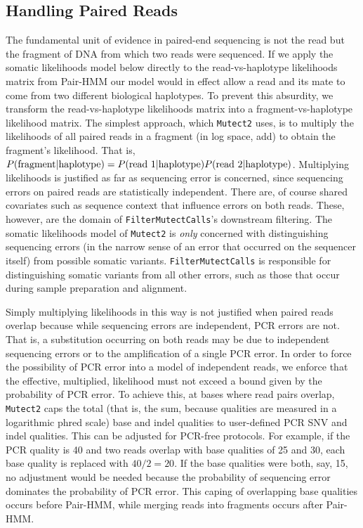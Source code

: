 \documentclass[nofootinbib,amssymb,amsmath]{revtex4}
\newcommand{\code}[1]{\texttt{#1}}
\begin{document}
\subsection{Handling Paired Reads}
The fundamental unit of evidence in paired-end sequencing is not the read but the fragment of DNA from which two reads were sequenced.  If we apply the somatic likelihoods model below directly to the read-vs-haplotype likelihoods matrix from Pair-HMM our model would in effect allow a read and its mate to come from two different biological haplotypes.  To prevent this absurdity, we transform the read-vs-haplotype likelihoods matrix into a fragment-vs-haplotype likelihood matrix.  The simplest approach, which \code{Mutect2} uses, is to multiply the likelihoods of all paired reads in a fragment (in log space, add) to obtain the fragment's likelihood.  That is, $P({\rm fragment} | {\rm haplotype}) = P({\rm read~1} | {\rm haplotype}) P({\rm read~2} | {\rm haplotype})$.  Multiplying likelihoods is justified as far as sequencing error is concerned, since sequencing errors on paired reads are statistically independent.  There are, of course shared covariates such as sequence context that influence errors on both reads.  These, however, are the domain of \code{FilterMutectCalls}'s downstream filtering.  The somatic likelihoods model of \code{Mutect2} is \textit{only} concerned with distinguishing sequencing errors (in the narrow sense of an error that occurred on the sequencer itself) from possible somatic variants.  \code{FilterMutectCalls} is responsible for distinguishing somatic variants from all other errors, such as those that occur during sample preparation and alignment.

Simply multiplying likelihoods in this way is not justified when paired reads overlap because while sequencing errors are independent, PCR errors are not.  That is, a substitution occurring on both reads may be due to independent sequencing errors or to the amplification of a single PCR error.  In order to force the possibility of PCR error into a model of independent reads, we enforce that the effective, multiplied, likelihood must not exceed a bound given by the probability of PCR error.  To achieve this, at bases where read pairs overlap, \code{Mutect2} caps the total (that is, the sum, because qualities are measured in a logarithmic phred scale) base and indel qualities to user-defined PCR SNV and indel qualities.  This can be adjusted for PCR-free protocols.  For example, if the PCR quality is 40 and two reads overlap with base qualities of 25 and 30, each base quality is replaced with $40/2 = 20$.  If the base qualities were both, say, 15, no adjustment would be needed because the probability of sequencing error dominates the probability of PCR error.  This caping of overlapping base qualities occurs before Pair-HMM, while merging reads into fragments occurs after Pair-HMM.
\end{document}
